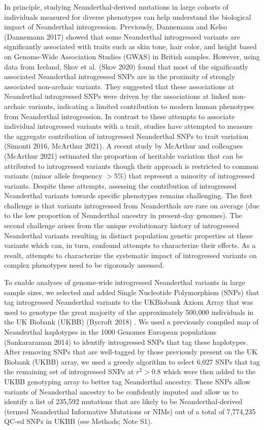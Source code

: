 In principle, studying Neanderthal-derived mutations in large cohorts of individuals measured for diverse phenotypes can help understand the biological impact of Neanderthal introgression. Previously, Dannemann and Kelso (Dannemann 2017) showed that some Neanderthal introgressed variants are significantly associated with traits such as skin tone, hair color, and height based on Genome-Wide Association Studies (GWAS) in British samples. However, using data from Iceland, Skov et al. (Skov 2020) found that most of the significantly associated Neanderthal introgressed SNPs are in the proximity of strongly associated non-archaic variants. They suggested that these associations at Neanderthal introgressed SNPs were driven by the associations at linked non-archaic variants, indicating a limited contribution to modern human phenotypes from Neanderthal introgression. In contrast to these attempts to associate individual introgressed variants with a trait, studies have attempted to measure the aggregate contribution of introgressed Neanderthal SNPs to trait variation (Simonti 2016, McArthur 2021). A recent study by McArthur and colleagues (McArthur 2021) estimated the proportion of heritable variation that can be attributed to introgressed variants though their approach is restricted to common variants (minor allele frequency $> 5\%$)  that represent a minority of introgressed variants. Despite these attempts, assessing the contribution of introgressed Neanderthal variants towards specific phenotypes remains challenging. The first challenge is that variants introgressed from Neanderthals are rare on average (due to the low proportion of Neanderthal ancestry in present-day genomes). The second challenge arises from the unique evolutionary history of introgressed Neanderthal variants resulting in distinct population genetic properties at these variants which can, in turn, confound attempts to characterize their effects. As a result, attempts to characterize the systematic impact of introgressed variants on complex phenotypes need to be rigorously assessed.

To enable analyses of genome-wide introgressed Neanderthal variants in large sample sizes, we selected and added Single Nucleotide Polymorphism (SNPs) that tag introgressed Neanderthal variants to the UKBiobank Axiom Array that was used to genotype the great majority of the approximately 500,000 individuals in the UK Biobank (UKBB) (Bycroft 2018) . We used a previously compiled map of Neanderthal haplotypes in the 1000 Genomes European populations (Sankararaman 2014) to identify introgressed SNPs that tag these haplotypes. After removing SNPs that are well-tagged by those previously present on the UK Biobank (UKBB) array, we used a greedy algorithm to select 6,027 SNPs that tag the remaining set of introgressed SNPs at $r^2>0.8$ which were then added to the UKBB genotyping array to better tag Neanderthal ancestry. These SNPs allow variants of Neanderthal ancestry to be confidently imputed and allow us to identify a list of 235,592 mutations that are likely to be Neanderthal-derived (termed Neanderthal Informative Mutations or NIMs) out of a total of  7,774,235 QC-ed SNPs in UKBB (see Methods; Note S1). 

